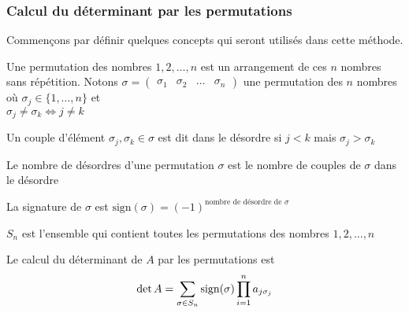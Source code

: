 \subsubsection{Calcul du déterminant par les permutations}
Commençons par définir quelques concepts qui seront utilisés dans cette méthode.
\begin{definition}
    Une permutation des nombres $1, 2, \dots, n$ est un arrangement de ces $n$ nombres sans répétition. Notons $\sigma = \begin{pmatrix} \sigma_1 & \sigma_2 & \dots & \sigma_n \end{pmatrix}$ une permutation des $n$ nombres où $\sigma_j \in \{1, \dots, n \}$ et \\ $\sigma_j \neq \sigma_k \iff j \neq k$
\end{definition}
\begin{definition}
    Un couple d'élément $\sigma_j, \sigma_k \in \sigma$ est dit dans le désordre si $j < k$ mais $\sigma_j > \sigma_k$
\end{definition}
\begin{definition}
    Le nombre de désordres d'une permutation $\sigma$ est le nombre de couples de $\sigma$ dans le désordre
\end{definition}
\begin{definition}
    La signature de $\sigma$ est $\text{sign}(\sigma) = (-1)^{\text{nombre de désordre de $\sigma$}}$
\end{definition}
\begin{definition}
    $S_n$ est l'ensemble qui contient toutes les permutations des nombres $1, 2, \dots, n$
\end{definition}

\begin{theorem}
    Le calcul du déterminant de $A$ par les permutations est
    \[
        \det A = \sum_{\sigma \in S_n} \textup{sign}(\sigma) \prod_{i = 1}^{n}a_{j \sigma_j}
    \]
\end{theorem}

